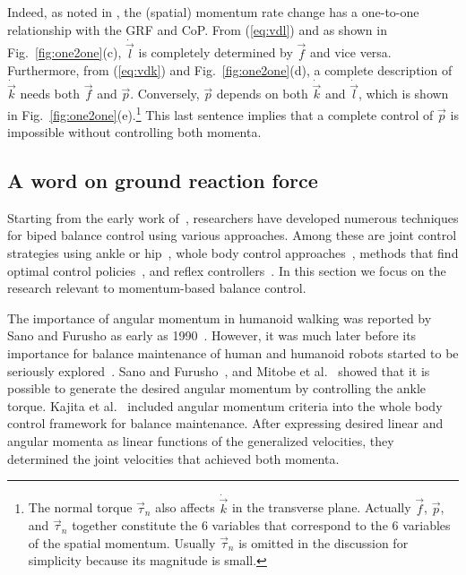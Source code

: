 \documentclass{llncs}
\newcommand{\vp}{\vec{p}}
\newcommand{\vtau}{\vec{\tau}}
\newcommand{\vf}{\vec{f}}
\newcommand{\vdk} {\dot{\vec{k}}}
\newcommand{\vdl} {\dot{\vec{l}}}
\renewcommand{\section}[1]{\vspace{0.1in}\noindent{\large\bf{#1}}\par\vspace{.05in}\par\nopagebreak}
\begin{document}
Indeed, as noted in \cite{Macchietto09}, the (spatial) momentum
rate change has a one-to-one relationship with the GRF and CoP.
From (\ref{eq:vdl}) and as shown in Fig.~\ref{fig:one2one}(c), $\vdl$ is completely determined by
$\vf$ and vice versa. Furthermore, from (\ref{eq:vdk}) and Fig.~\ref{fig:one2one}(d), a complete
description of $\vdk$ needs both $\vf$ and
$\vp$. Conversely, $\vp$ depends on both $\vdk$ and $\vdl$,  which is shown in Fig.~\ref{fig:one2one}(e).\footnote{The normal torque $\vtau_n$ also affects $\vdk$ in the
transverse plane. Actually $\vf$, $\vp$, and $\vtau_n$ together
constitute the 6 variables that correspond to the 6 variables of the spatial momentum.
Usually $\vtau_n$ is omitted in the discussion for simplicity
because its magnitude is small.}
This last sentence implies that a complete control of $\vp$ is impossible
without controlling both momenta.%


\subsection{A word on ground reaction force}


\section{Related Work}


Starting from the early work of~\cite{Vuko69}, researchers have
developed numerous techniques for biped balance control
using various approaches.
Among these are joint control strategies using ankle or hip~\cite{Sano90,Stephens07},
whole body control approaches~\cite{Kagami00,Sugihara02,KKKFHYH03,Choi07,Park05,Stephens10},
methods that find optimal control policies~\cite{Zhou03,Muico09},
and reflex controllers~\cite{Huang05}.
In this section we focus on the research relevant
to momentum-based balance control.

The importance of angular momentum in humanoid walking was reported by Sano and
Furusho as early as 1990~\cite{Sano90}. However, it was much later before its
importance for balance maintenance
of human and humanoid robots started to be seriously explored~\cite{KKKFHYH03,Goswami04,PHH04}.
Sano and Furusho~\cite{Sano90}, and Mitobe et al.~\cite{Mitobe04}
showed that it is possible to generate the desired angular momentum
by controlling the ankle torque.
Kajita et al.~\cite{KKKFHYH03} included angular momentum criteria into the
whole body control framework for balance maintenance.
After expressing desired linear and angular momenta as linear functions of the
generalized velocities, they determined the joint velocities
that achieved both momenta.
\end{document}

